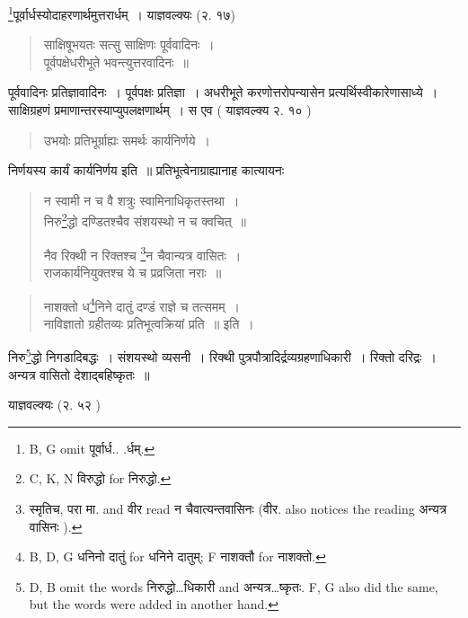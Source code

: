 \documentclass[11pt, openany]{book}
\begin{document}
\renewcommand{\thefootnote}{2}\footnote{B, G omit पूर्वार्ध.. .र्धम्.}पूर्वार्धस्योदाहरणार्थमुत्तरार्धम्~। याज्ञवल्क्यः (२. १७) 

\begin{quote}
{\vy साक्षिषूभयतः सत्सु साक्षिणः पूर्ववादिनः~।\\
पूर्वपक्षेधरीभूते भवन्त्युत्तरवादिनः~॥}
\end{quote}

पूर्ववादिनः प्रतिज्ञावादिनः~। पूर्वपक्षः प्रतिज्ञा~। अधरीभूते करणोत्तरोपन्यासेन प्रत्यर्थिस्वीकारेणासाध्ये~। साक्षिग्रहणं
प्रमाणान्तरस्याप्युपलक्षणार्थम्~। स एव ( याज्ञवल्क्य २. १० )

\begin{quote}
{\vy उभयोः प्रतिभूर्ग्राह्यः समर्थः कार्यनिर्णये~।}
\end{quote}

निर्णयस्य कार्यं कार्यनिर्णय इति~॥ प्रतिभूत्वेनाग्राह्यानाह कात्यायनः

\begin{quote}
{\vy न स्वामी न च वै शत्रुः स्वामिनाधिकृतस्तथा~।\\
निरु\renewcommand{\thefootnote}{3}\footnote{C, K, N विरुद्धो for निरुद्धो.}द्धो दण्डितश्चैव संशयस्थो न च क्वचित्~॥

नैव रिक्थी न रिक्तश्च \renewcommand{\thefootnote}{4}\footnote{स्मृतिच, परा मा. and वीर read न चैवात्यन्तवासिनः (वीर. also notices the reading अन्यत्र वासिनः ).}न चैवान्यत्र वासितः~।\\
राजकार्यनियुक्तश्च ये च प्रव्रजिता नराः~॥}
\end{quote}

\newpage
{}

\begin{quote}
{\vy नाशक्तो ध\renewcommand{\thefootnote}{1}\footnote{B, D, G धनिनो दातुं for धनिने दातुम्; F नाशक्तौ for नाशक्तो.}निने दातुं दण्डं राज्ञे च तत्समम्~।\\
नाविज्ञातो ग्रहीतव्यः प्रतिभूत्वक्रियां प्रति~॥} इति~।
\end{quote}

निरु\renewcommand{\thefootnote}{2}\footnote{D, B omit the words निरुद्धो\ldots धिकारी and अन्यत्र\ldots ष्कृतः. F, G also did the same, but the words were added in another hand.}द्धो निगडादिबद्धः~। संशयस्थो व्यसनी~। रिक्थी पुत्रपौत्रादिर्द्रव्यग्रहणाधिकारी~। रिक्तो दरिद्रः~। अन्यत्र वासितो देशाद्बहिष्कृतः~॥

याज्ञवल्क्यः (२. ५२ )
\end{document}
